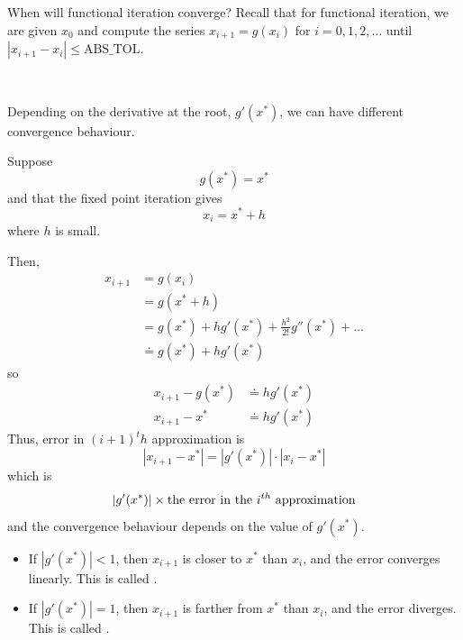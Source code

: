When will functional iteration converge? Recall that for functional iteration, we are given \( x_0 \) and compute the series \( x_{i+1} = g(x_i) \) for \( i = 0, 1, 2, \dots \) until \( | x_{i+1} - x_i | \leq \text{ABS\_TOL} \).

    {~~~}

Depending on the derivative at the root, \( g'(x^\ast) \), we can have different convergence behaviour.

Suppose \[
    g(x^\ast) = x^\ast
\] and that the fixed point iteration gives \[
    x_i = x^\ast + h
\] where \( h \) is small.

Then, \begin{align*}
    x_{i+1} & = g(x_i)                                                        \\
            & = g(x^\ast + h)                                                 \\
            & = g(x^\ast) + h g'(x^\ast) + \frac{h^2}{2!} g''(x^\ast) + \dots \\
            & \doteq g(x^\ast) + h g'(x^\ast)
\end{align*} so \begin{align*}
    x_{i+1} - g(x^\ast) & \doteq h g'(x^\ast) \\
    x_{i+1} - x^\ast    & \doteq h g'(x^\ast)
\end{align*}
Thus, error in \( (i+1)^th \) approximation is \[
    | x_{i+1} - x^\ast | = | g'(x^\ast) | \cdot | x_i - x^\ast |
\] which is \[
    | g'(x^\ast) | \times \text{the error in the \( i^{th} \) approximation}
\] and the convergence behaviour depends on the value of \( g'(x^\ast) \).

\begin{itemize}
    \item If \( |g'(x^\ast)| < 1 \), then \( x_{i+1} \) is closer to \( x^\ast \) than \( x_i \), and the error converges linearly. This is called .
    \item If \( |g'(x^\ast)| = 1 \), then \( x_{i+1} \) is farther from \( x^\ast \) than \( x_i \), and the error diverges. This is called .
\end{itemize}

